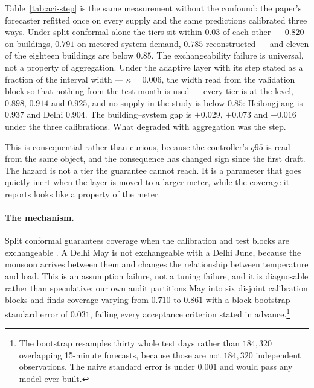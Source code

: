 Table~\ref{tab:aci-step} is the same measurement without the confound: the
paper's forecaster refitted once on every supply and the same predictions
calibrated three ways. Under split conformal alone the tiers sit within $0.03$
of each other --- $0.820$ on buildings, $0.791$ on metered system demand,
$0.785$ reconstructed --- and eleven of the eighteen buildings are below
$0.85$. The exchangeability failure is universal, not a property of
aggregation. Under the adaptive layer with its step stated as a fraction of the
interval width --- $\kappa=0.006$, the width read from the validation block so
that nothing from the test month is used --- every tier is at the level,
$0.898$, $0.914$ and $0.925$, and no supply in the study is below $0.85$:
Heilongjiang is $0.937$ and Delhi $0.904$. The building--system gap is
$+0.029$, $+0.073$ and $-0.016$ under the three calibrations. What degraded
with aggregation was the step.

This is consequential rather than curious, because the controller's $q95$ is
read from the same object, and the consequence has changed sign since the first
draft. The hazard is not a tier the guarantee cannot reach. It is a parameter
that goes quietly inert when the layer is moved to a larger meter, while the
coverage it reports looks like a property of the meter.

\paragraph{The mechanism.} Split conformal guarantees coverage when the
calibration and test blocks are exchangeable
\citep{vovk2005algorithmic,romano2019cqr}. A Delhi May is not exchangeable with
a Delhi June, because the monsoon arrives between them and changes the
relationship between temperature and load. This is an assumption failure, not a
tuning failure, and it is diagnosable rather than speculative: our own audit
partitions May into six disjoint calibration blocks and finds coverage varying
from $0.710$ to $0.861$ with a block-bootstrap standard error of $0.031$,
failing every acceptance criterion stated in advance.\footnote{The bootstrap
resamples thirty whole test days rather than $184{,}320$ overlapping 15-minute
forecasts, because those are not $184{,}320$ independent observations. The naive
standard error is under $0.001$ and would pass any model ever built.}



